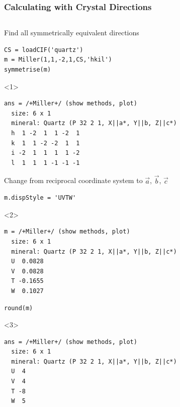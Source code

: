 \documentclass[compress]{beamer}
\begin{document}
\begin{frame}[fragile]
  \frametitle{Calculating with Crystal Directions}

   \begin{columns}
     \begin{column}{8.6cm}
         \begin{overlayarea}{\textwidth}{8cm}
           Find all symmetrically equivalent directions
           \vspace{-0.1cm}
           \begin{lstlisting}[style=input]
CS = loadCIF('quartz')
m = Miller(1,1,-2,1,CS,'hkil')
symmetrise(m)
           \end{lstlisting}

           \begin{onlyenv}<1>
             \vspace{-.3cm}
            \begin{lstlisting}[style=output]
ans = /+Miller+/ (show methods, plot)
  size: 6 x 1
  mineral: Quartz (P 32 2 1, X||a*, Y||b, Z||c*)
  h  1 -2  1  1 -2  1
  k  1  1 -2 -2  1  1
  i -2  1  1  1  1 -2
  l  1  1  1 -1 -1 -1
       \end{lstlisting}
     \end{onlyenv}

        \pause
        \medskip

        Change from reciprocal coordinate system to $\vec a$, $\vec b$,
        $\vec c$
        \vspace{-0.1cm}
  \begin{lstlisting}[style=input]
m.dispStyle = 'UVTW'
  \end{lstlisting}
           \begin{onlyenv}<2>
             \vspace{-.3cm}
             \begin{lstlisting}[style=output]
m = /+Miller+/ (show methods, plot)
  size: 6 x 1
  mineral: Quartz (P 32 2 1, X||a*, Y||b, Z||c*)
  U  0.0828
  V  0.0828
  T -0.1655
  W  0.1027
       \end{lstlisting}
     \end{onlyenv}

        \pause
        \vspace{-.3cm}

  \begin{lstlisting}[style=input]
round(m)
  \end{lstlisting}
           \begin{onlyenv}<3>
             \vspace{-.3cm}
             \begin{lstlisting}[style=output]
ans = /+Miller+/ (show methods, plot)
  size: 6 x 1
  mineral: Quartz (P 32 2 1, X||a*, Y||b, Z||c*)
  U  4
  V  4
  T -8
  W  5
       \end{lstlisting}
     \end{onlyenv}


\end{overlayarea}
\end{column}
\end{columns}
\end{frame}
\end{document}

